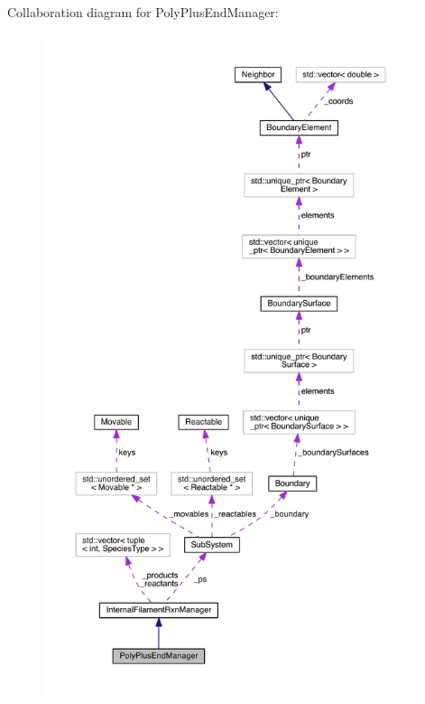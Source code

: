 Collaboration diagram for Poly\+Plus\+End\+Manager\+:
\nopagebreak
\begin{figure}[H]
\begin{center}
\leavevmode
\includegraphics[height=550pt]{classPolyPlusEndManager__coll__graph}
\end{center}
\end{figure}
